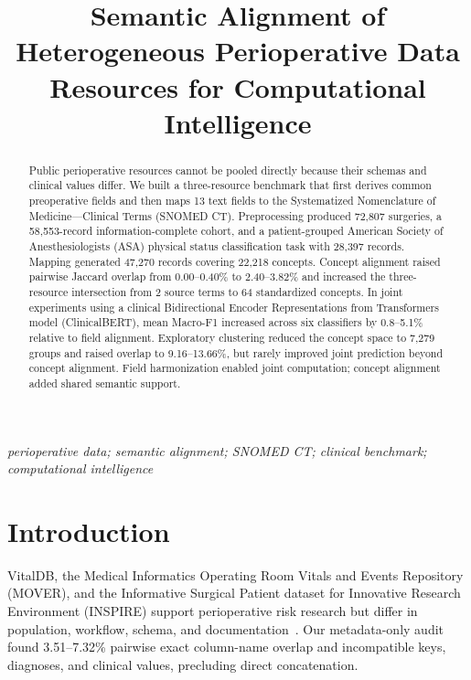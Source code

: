 \documentclass[a4paper,conference]{IEEEtran}
\begin{document}
\title{Semantic Alignment of Heterogeneous Perioperative Data Resources for Computational Intelligence}

\author{
\IEEEauthorblockN{\parbox[t]{\textwidth}{\centering\paperauthors}}
\IEEEauthorblockA{\parbox[t]{\textwidth}{\centering\paperaffiliations}}
\IEEEauthorblockA{\papercorrespondence}
}

\maketitle

\begin{abstract}
Public perioperative resources cannot be pooled directly because their schemas and clinical values differ. We built a three-resource benchmark that first derives common preoperative fields and then maps 13 text fields to the Systematized Nomenclature of Medicine---Clinical Terms (SNOMED CT). Preprocessing produced 72,807 surgeries, a 58,553-record information-complete cohort, and a patient-grouped American Society of Anesthesiologists (ASA) physical status classification task with 28,397 records. Mapping generated 47,270 records covering 22,218 concepts. Concept alignment raised pairwise Jaccard overlap from 0.00--0.40\% to 2.40--3.82\% and increased the three-resource intersection from 2 source terms to 64 standardized concepts. In joint experiments using a clinical Bidirectional Encoder Representations from Transformers model (\mbox{ClinicalBERT}), mean Macro-F1 increased across six classifiers by 0.8--5.1\% relative to field alignment. Exploratory clustering reduced the concept space to 7,279 groups and raised overlap to 9.16--13.66\%, but rarely improved joint prediction beyond concept alignment. Field harmonization enabled joint computation; concept alignment added shared semantic support.
\end{abstract}

\vspace{\baselineskip}

\begin{IEEEkeywords}
\textit{perioperative data; semantic alignment; SNOMED CT; clinical benchmark; computational intelligence}
\end{IEEEkeywords}

\section{Introduction}
VitalDB, the Medical Informatics Operating Room Vitals and Events Repository (MOVER), and the Informative Surgical Patient dataset for Innovative Research Environment (INSPIRE) support perioperative risk research but differ in population, workflow, schema, and documentation~\cite{vitaldb,mover,inspire}. Our metadata-only audit found 3.51--7.32\% pairwise exact column-name overlap and incompatible keys, diagnoses, and clinical values, precluding direct concatenation.
\end{document}
